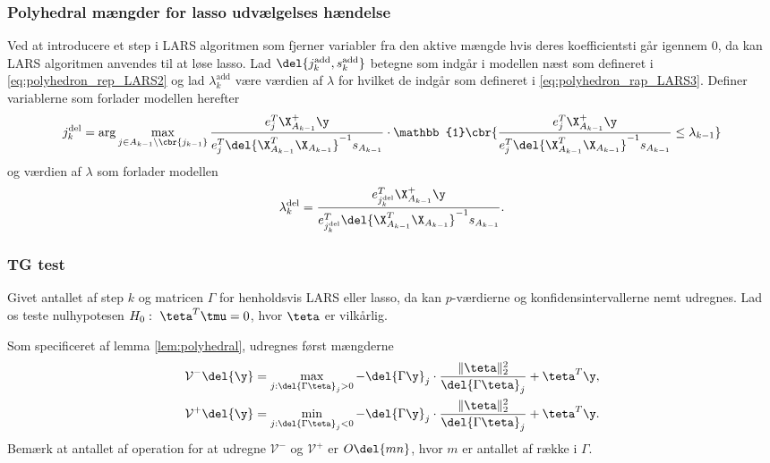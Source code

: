 \subsubsection{Polyhedral mængder for lasso udvælgelses hændelse}
Ved at introducere et step i LARS algoritmen som fjerner variabler fra den aktive mængde hvis deres koefficientsti  går igennem 0, da kan LARS algoritmen anvendes til at løse lasso.
Lad \(\del{j_k^\text{add}, s_k^\text{add}}\) betegne som indgår i modellen næst som defineret i \eqref{eq:polyhedron_rep_LARS2} og lad \(\lambda_k^\text{add}\) være værdien af \(\lambda\) for hvilket de indgår som defineret i \eqref{eq:polyhedron_rap_LARS3}.
Definer variablerne som forlader modellen herefter
\begin{align*}
j_k^\text{del} = \arg \max_{j \in A_{k-1} \backslash \cbr{j_{k-1}}} \frac{e_j^T \X_{A_{k-1}}^+ \y}{e_j^T \del{\X_{A_{k-1}}^T \X_{A_{k-1}}}^{-1} s_{A_{k-1}}} \cdot \mathbb{1} \cbr{\frac{e_j^T \X_{A_{k-1}}^+ \y}{e_j^T \del{\X_{A_{k-1}}^T \X_{A_{k-1}}}^{-1} s_{A_{k-1}}} \leq \lambda_{k-1}}
\end{align*}
og værdien af \(\lambda\) som forlader modellen
\begin{align*}
\lambda_k^\text{del} = \frac{e_{j_k^\text{del}}^T \X_{A_{k-1}}^+ \y}{e_{j_k^\text{del}}^T \del{\X_{A_{k-1}}^T \X_{A_{k-1}}}^{-1} s_{A_{k-1}}}.
\end{align*}



\subsubsection{TG test}
Givet antallet af step \(k\) og matricen \(\Gamma\) for henholdsvis LARS eller lasso, da kan \(p\)-værdierne og konfidensintervallerne nemt udregnes.
Lad os teste nulhypotesen \(H_0: \ \teta^T \tmu = 0\), hvor \(\teta\) er vilkårlig.

Som specificeret af lemma \ref{lem:polyhedral}, udregnes først mængderne
\begin{align*}
\mathcal{V}^- \del{\y} &= \max_{j: \del{\Gamma \teta}_j > 0} - \del{\Gamma \y}_j \cdot \frac{\Vert \teta \Vert_2^2}{\del{\Gamma \teta}_j} + \teta^T \y, \\
\mathcal{V}^+ \del{\y} &= \min_{j: \del{\Gamma \teta}_j < 0} - \del{\Gamma \y}_j \cdot \frac{\Vert \teta \Vert_2^2}{\del{\Gamma \teta}_j} + \teta^T \y.
\end{align*}
Bemærk at antallet af operation for at udregne \(\mathcal{V}^-\) og \(\mathcal{V}^+\) er \(O \del{mn}\), hvor \(m\) er antallet af række i \(\Gamma\).

